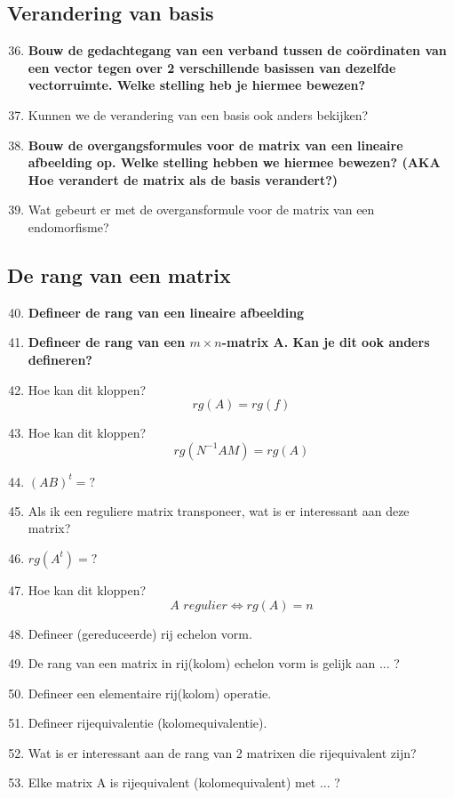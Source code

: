 \documentclass[12pt]{article}
\begin{document}
    \subsection{Verandering van basis}
    \begin{enumerate}
        \setcounter{enumi}{35}
        \item \textbf{Bouw de gedachtegang van een verband tussen de coördinaten van een vector tegen over 2 verschillende basissen van dezelfde vectorruimte. Welke stelling heb je hiermee bewezen?}
        \item Kunnen we de verandering van een basis ook anders bekijken?
        \item \textbf{Bouw de overgangsformules voor de matrix van een lineaire afbeelding op. Welke stelling hebben we hiermee bewezen? (AKA Hoe verandert de matrix als de basis verandert?)}
        \item Wat gebeurt er met de overgansformule voor de matrix van een endomorfisme?
    \end{enumerate}
    \subsection{De rang van een matrix}
    \begin{enumerate}
        \setcounter{enumi}{39}
        \item \textbf{Defineer de rang van een lineaire afbeelding}
        \item \textbf{Defineer de rang van een $m \times n$-matrix A. Kan je dit ook anders defineren?}
        \item Hoe kan dit kloppen? $$rg(A)=rg(f)$$
        \item Hoe kan dit kloppen? $$rg(N^{-1}AM)=rg(A)$$
        \item $(AB)^t = ?$
        \item Als ik een reguliere matrix transponeer, wat is er interessant aan deze matrix?
        \item $rg(A^t)= ?$
        \item Hoe kan dit kloppen? $$A \,\, regulier \Leftrightarrow rg(A)=n$$
        \item Defineer (gereduceerde) rij echelon vorm.
        \item De rang van een matrix in rij(kolom) echelon vorm is gelijk aan ... ?
        \item Defineer een elementaire rij(kolom) operatie.
        \item Defineer rijequivalentie (kolomequivalentie).
        \item Wat is er interessant aan de rang van 2 matrixen die rijequivalent zijn?
        \item Elke matrix A is rijequivalent (kolomequivalent) met ... ? 
    \end{enumerate}
\end{document}
